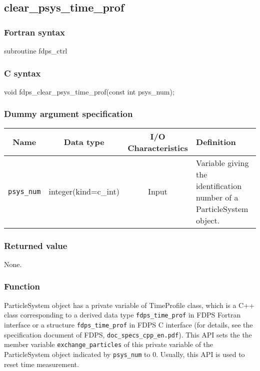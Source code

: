 \clearpage

\subsection{clear\_psys\_time\_prof}
\subsubsection*{Fortran syntax}
\begin{screen}
\begin{spverbatim}
subroutine fdps_ctrl%
\end{spverbatim}
\end{screen}

\subsubsection*{C syntax}
\begin{screen}
\begin{spverbatim}
void fdps_clear_psys_time_prof(const int psys_num);
\end{spverbatim}
\end{screen}

\subsubsection*{Dummy argument specification}
\begin{table}[h]
\begin{tabularx}{\linewidth}{cccX}
\toprule
\rowcolor{Snow2}
Name & Data type & I/O Characteristics & Definition \\ 
\midrule
\texttt{psys\_num} & integer(kind=c\_int) & Input & Variable giving the identification number of a ParticleSystem object.\\
\bottomrule
\end{tabularx}
\end{table}

\subsubsection*{Returned value}
None.

\subsubsection*{Function}
ParticleSystem object has a private variable of TimeProfile class, which is a C++ class corresponding to a derived data type \texttt{fdps\_time\_prof} in FDPS Fortran interface  or a structure \texttt{fdps\_time\_prof} in FDPS C interface (for details, see the specification document of FDPS, \texttt{doc\_specs\_cpp\_en.pdf}). This API sets the the member variable \texttt{exchange\_particles} of this private variable of the ParticleSystem object indicated by \texttt{psys\_num} to 0. Usually, this API is used to reset time measurement.

